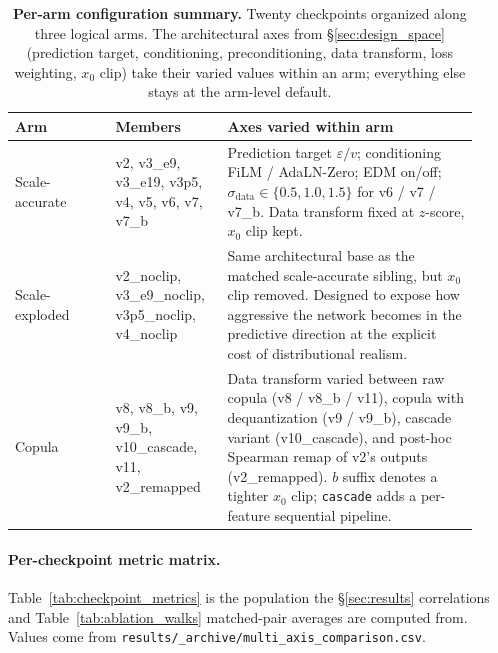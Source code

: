 \documentclass[journal]{IEEEtran}
\newcommand{\eps}{\varepsilon}
\theoremstyle{definition}   %
\begin{document}
\begin{table}[ht]
    \centering
    \footnotesize
    \begin{tabular}{p{0.20\linewidth} p{0.22\linewidth} p{0.50\linewidth}}
        \toprule
        Arm & Members & Axes varied within arm \\
        \midrule
        Scale-accurate & v2, v3\_e9, v3\_e19, v3p5, v4, v5, v6, v7, v7\_b & Prediction target $\eps/v$; conditioning FiLM / AdaLN-Zero; EDM on/off; $\sigma_{\text{data}} \in \{0.5, 1.0, 1.5\}$ for v6 / v7 / v7\_b. Data transform fixed at $z$-score, $x_0$ clip kept. \\
        \midrule
        Scale-exploded & v2\_noclip, v3\_e9\_noclip, v3p5\_noclip, v4\_noclip & Same architectural base as the matched scale-accurate sibling, but $x_0$ clip removed. Designed to expose how aggressive the network becomes in the predictive direction at the explicit cost of distributional realism. \\
        \midrule
        Copula & v8, v8\_b, v9, v9\_b, v10\_cascade, v11, v2\_remapped & Data transform varied between raw copula (v8 / v8\_b / v11), copula with dequantization (v9 / v9\_b), cascade variant (v10\_cascade), and post-hoc Spearman remap of v2's outputs (v2\_remapped). $b$ suffix denotes a tighter $x_0$ clip; \texttt{cascade} adds a per-feature sequential pipeline. \\
        \bottomrule
    \end{tabular}
    \caption{\textbf{Per-arm configuration summary.} Twenty
    checkpoints organized along three logical arms. The
    architectural axes from \S\ref{sec:design_space} (prediction
    target, conditioning, preconditioning, data transform, loss
    weighting, $x_0$ clip) take their varied values within an arm;
    everything else stays at the arm-level default.}
    \label{tab:checkpoint_arms}
\end{table}

\paragraph{Per-checkpoint metric matrix.}
Table~\ref{tab:checkpoint_metrics} is the population the §\ref{sec:results}
correlations and Table~\ref{tab:ablation_walks} matched-pair averages
are computed from. Values come from
\texttt{results/\_archive/multi\_axis\_comparison.csv}.
\end{document}
